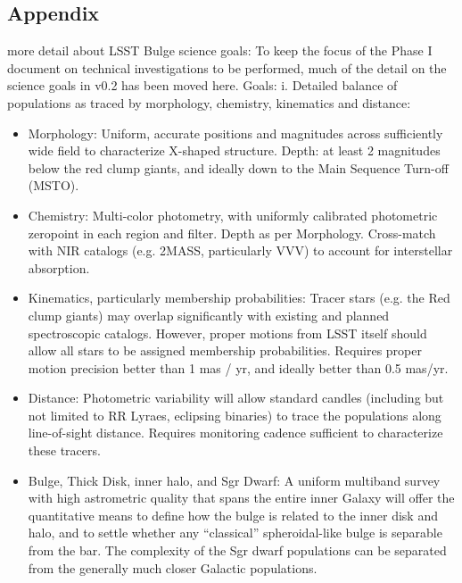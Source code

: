 \subsection{Appendix}
more detail about LSST Bulge science goals: To keep the focus of the Phase I document on technical investigations to be performed, much of the detail on the science goals in v0.2 has been moved here. Goals: 
i. Detailed balance of populations as traced by morphology, chemistry, kinematics and distance: 
\begin{itemize}
\item{Morphology: Uniform, accurate positions and magnitudes across sufficiently wide field to characterize 
X-shaped structure. Depth: at least 2 magnitudes below the red clump giants, and ideally down to the 
Main Sequence Turn-off (MSTO). }
\item{Chemistry: Multi-color photometry, with uniformly calibrated photometric zeropoint in each region and 
filter. Depth as per Morphology. Cross-match with NIR catalogs (e.g. 2MASS, particularly VVV) to account 
for interstellar absorption. }
\item{Kinematics, particularly membership probabilities: Tracer stars (e.g. the Red clump giants) may overlap 
significantly with existing and planned spectroscopic catalogs. However, proper motions from LSST itself should allow all stars to be assigned membership probabilities. Requires proper motion precision better than 1 mas / yr, and ideally better than 0.5 mas/yr. }
\item{Distance: Photometric variability will allow standard candles (including but not limited to RR Lyraes, eclipsing binaries) to trace the populations along line-of-sight distance. Requires monitoring cadence sufficient to characterize these tracers. }
\item{Bulge, Thick Disk, inner halo, and Sgr Dwarf: A uniform multiband survey with high astrometric quality that spans the entire inner Galaxy will offer the quantitative means to define how the bulge is related to the inner disk and halo, and to settle whether any “classical” spheroidal-like bulge is separable from the bar. The complexity of the Sgr dwarf populations can be separated from the generally much closer Galactic populations. }
\end{itemize}

